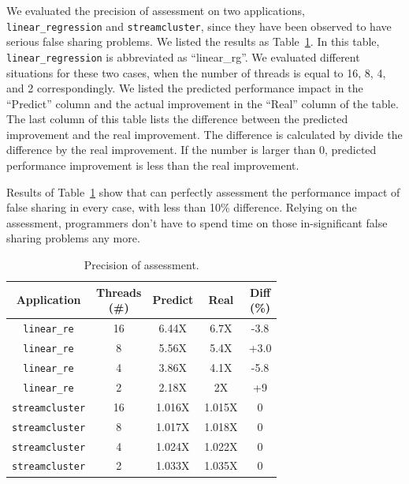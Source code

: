 We evaluated the precision of assessment on two applications, \texttt{linear\_regression} and \texttt{streamcluster}, since they have been observed to have serious false sharing problems. We listed the results as Table~\ref{tbl: precision}. In this table, \texttt{linear\_regression} is abbreviated as ``linear\_rg''.  We evaluated different situations for these two cases, when the number of threads is equal to 16, 8, 4, and 2 correspondingly. We listed the predicted performance impact in the ``Predict'' column and the actual improvement in the ``Real'' column of the table. The last column of this table lists the difference between the predicted improvement and the real improvement. The difference is calculated by divide the difference by the real improvement. If the number is larger than 0, predicted performance improvement is less than the real improvement.  

Results of Table~\ref{tbl: precision} show that \cheetah{} can perfectly assessment the performance impact of false sharing in every case, with less than 10\% difference. Relying on the assessment, programmers don't have to spend time on those in-significant false sharing problems any more. 


\begin{table}
  \small
  \centering
  \begin{tabular}{ c | c | c | c | c}
  \textbf{Application} & \specialcell{Threads \\ (\#)} & \textbf{Predict} & \textbf{Real} & \specialcell{Diff \\ (\%)}\\ \hline
\texttt{linear\_re} & 16 & 6.44X    & 6.7X & {-3.8}\\
\texttt{linear\_re}& 8  & 5.56X    & 5.4X & {+3.0}\\
\texttt{linear\_re} & 4  & 3.86X  & 4.1X  & {-5.8}\\
 \texttt{linear\_re}& 2  & 2.18X  & 2X    & {+9}\\ \hline
 \texttt{streamcluster} & 16 & 1.016X    & 1.015X &  {0}\\
 \texttt{streamcluster} & 8 & 1.017X    & 1.018X & {0}\\
 \texttt{streamcluster} & 4 & 1.024X    & 1.022X & {0}\\
 \texttt{streamcluster} & 2 & 1.033X    & 1.035X & {0}
\end{tabular}
  \caption{
    Precision of assessment. \label{tbl: precision}}
\end{table}

